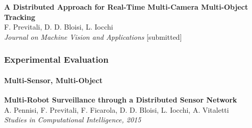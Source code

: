 \begin{frame}
	\tiny
	
	\textbf{A Distributed Approach for Real-Time Multi-Camera Multi-Object Tracking} \\
	F. Previtali, D. D. Bloisi, L. Iocchi \\
	\emph{Journal on Machine Vision and Applications} [submitted] \\
\end{frame}

\begin{frame}
	\frametitle{Experimental Evaluation}
	\framesubtitle{Multi-Sensor, Multi-Object}
	
	\begin{center}
		\hspace{-6.85cm}
	\end{center}
	
	\vspace{-2.5cm}
	
	\begin{tabbing}
		\hspace{5.55cm}
		\textbf{Multi-Robot Surveillance through a Distributed Sensor Network} \\
		\hspace{5.55cm}
		A. Pennisi, F. Previtali, F. Ficarola, D. D. Bloisi, L. Iocchi, A. Vitaletti \\
		\hspace{5.55cm}
		\emph{Studies in Computational Intelligence, 2015} \\
	\end{tabbing}
\end{frame}

